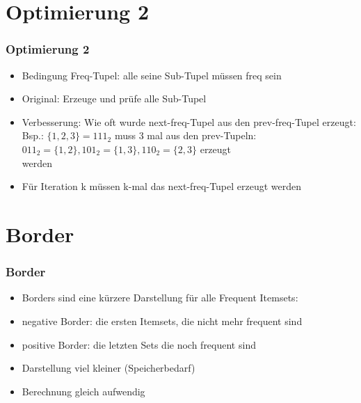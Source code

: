 \documentclass{beamer}
\begin{document}
\section{Optimierung 2}
\begin{frame} %
	\frametitle{Optimierung 2} %
		\begin{itemize}
			\item Bedingung Freq-Tupel: alle seine Sub-Tupel müssen freq sein
			\item Original: Erzeuge und prüfe alle Sub-Tupel 
			\item Verbesserung: Wie oft wurde next-freq-Tupel aus den prev-freq-Tupel erzeugt:\\
				\hspace{0.7cm}Bsp.: $\{1,2,3\} = 111_2$ muss 3 mal aus den prev-Tupeln: \\
				\hspace{1.0cm}${011_2=\{1,2\}, 101_2=\{1,3\}, 110_2=\{2,3\}}$ erzeugt\\
				\hspace{1.0cm}werden
				\hspace{0.7cm} 
			\item Für Iteration k müssen k-mal das next-freq-Tupel erzeugt werden
		\end{itemize}
\end{frame}


\section{Border}
\begin{frame} %
	\frametitle{Border} %
		\begin{itemize}
			\item Borders sind eine kürzere Darstellung für alle Frequent Itemsets:
			\item negative Border: die ersten Itemsets, die nicht mehr frequent sind
			\item positive Border: die letzten Sets die noch frequent sind
			\item Darstellung viel kleiner (Speicherbedarf)
			\item Berechnung gleich aufwendig
		\end{itemize}
\end{frame}
\end{document}
